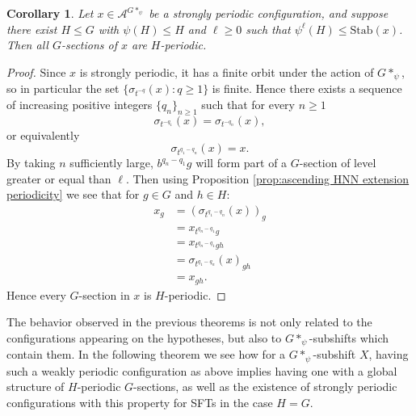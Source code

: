 \documentclass[cupthm,crop,info]{CUP-JNL-ETS}%
\theoremstyle{cupplain}
\newtheorem{corollary}[theorem]{Corollary}
\theoremstyle{cupdefinition}
\theoremstyle{cupremark}
\theoremstyle{cupproof}
\newtheorem{proof}{Proof}
\numberwithin{equation}{section}
\begin{document}
\begin{corollary}
	Let $x\in \mathcal{A}^{G*_{\psi}}$ be a strongly periodic configuration, and suppose there exist $H\leqslant G$ with $\psi(H)\leqslant H$ and $\ell \ge 0$ such that $\psi^{\ell}(H)\leqslant \mathrm{Stab}(x)$. Then all $G$-sections of $x$ are $H$-periodic.
\end{corollary}
\begin{proof}
	Since $x$ is strongly periodic, it has a finite orbit under the action of $G*_{\psi}$, so in particular the set $\{ \sigma_{t^{-q}}(x): q\ge 1 \}$ is finite. Hence there exists a sequence of increasing positive integers $\{q_n\}_{n\ge 1}$ such that for every $n\ge1$
	$$
	\sigma_{t^{-q_1}}(x)=\sigma_{t^{-q_n}}(x),
	$$
	or equivalently
	$$
	\sigma_{t^{q_1-q_n}}(x)=x.
	$$
	By taking $n$ sufficiently large, $b^{q_n-q_1}g$ will form part of a $G$-section of level greater or equal than $\ell$. Then using Proposition \ref{prop:ascending HNN extension periodicity} we see that for $g\in G$ and $h\in H$:
	\begin{align*}
	x_{g}&=(\sigma_{t^{q_1-q_n}}(x))_{g}\\
	&=x_{t^{q_n-q_1}g}\\
	&=x_{t^{q_n-q_1}gh}\\
	&=\sigma_{t^{q_1-q_n}}(x)_{gh}\\
	&=x_{gh}.
	\end{align*}
	Hence every $G$-section in $x$ is $H$-periodic.
\end{proof}

The behavior observed in the previous theorems is not only related to the configurations appearing on the hypotheses, but also to $G*_{\psi}$-subshifts which contain them. In the following theorem we see how for a $G*_{\psi}$-subshift $X$, having such a weakly periodic configuration as above implies having one with a global structure of $H$-periodic $G$-sections, as well as the existence of strongly periodic configurations with this property for SFTs in the case $H=G$.
\end{document}
